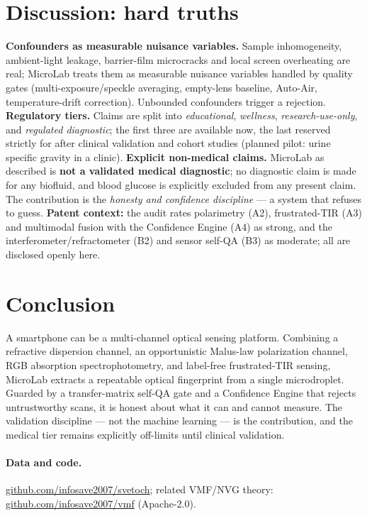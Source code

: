 \documentclass[11pt]{article}
\begin{document}
\section{Discussion: hard truths}
\textbf{Confounders as measurable nuisance variables.} Sample inhomogeneity, ambient-light
leakage, barrier-film microcracks and local screen overheating are real; MicroLab treats them
as measurable nuisance variables handled by quality gates (multi-exposure/speckle averaging,
empty-lens baseline, Auto-Air, temperature-drift correction). Unbounded confounders trigger a
rejection. \textbf{Regulatory tiers.} Claims are split into \emph{educational}, \emph{wellness},
\emph{research-use-only}, and \emph{regulated diagnostic}; the first three are available now, the
last reserved strictly for after clinical validation and cohort studies (planned pilot: urine
specific gravity in a clinic). \textbf{Explicit non-medical claims.} MicroLab as described is
\textbf{not a validated medical diagnostic}; no diagnostic claim is made for any biofluid, and
blood glucose is explicitly excluded from any present claim. The contribution is the
\emph{honesty and confidence discipline} --- a system that refuses to guess. \textbf{Patent
context:} the audit rates polarimetry (A2), frustrated-TIR (A3) and multimodal fusion with the
Confidence Engine (A4) as strong, and the interferometer/refractometer (B2) and sensor self-QA
(B3) as moderate; all are disclosed openly here.

\section{Conclusion}
A smartphone can be a multi-channel optical sensing platform. Combining a refractive dispersion
channel, an opportunistic Malus-law polarization channel, RGB absorption spectrophotometry, and
label-free frustrated-TIR sensing, MicroLab extracts a repeatable optical fingerprint from a
single microdroplet. Guarded by a transfer-matrix self-QA gate and a Confidence Engine that
rejects untrustworthy scans, it is honest about what it can and cannot measure. The validation
discipline --- not the machine learning --- is the contribution, and the medical tier remains
explicitly off-limits until clinical validation.

\paragraph{Data and code.} \href{https://github.com/infosave2007/svetoch}{github.com/infosave2007/svetoch}; related VMF/NVG theory: \href{https://github.com/infosave2007/vmf}{github.com/infosave2007/vmf}
(Apache-2.0).
\end{document}
